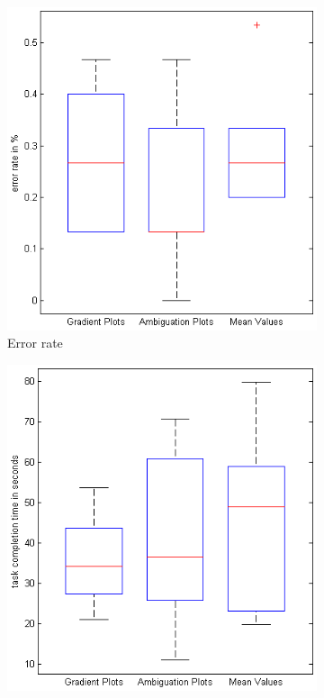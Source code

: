 \begin{figure}[H]
    \centering
    \begin{subfigure}[b]{0.32\textwidth}
        \includegraphics[width=\textwidth]{figures/boxplots/s2_error.png}
        \caption{Error rate}
        \label{fig:s2_error}
    \end{subfigure}
    \begin{subfigure}[b]{0.32\textwidth}
        \includegraphics[width=\textwidth]{figures/boxplots/s2_time.png}

\end{subfigure}
\end{figure}
